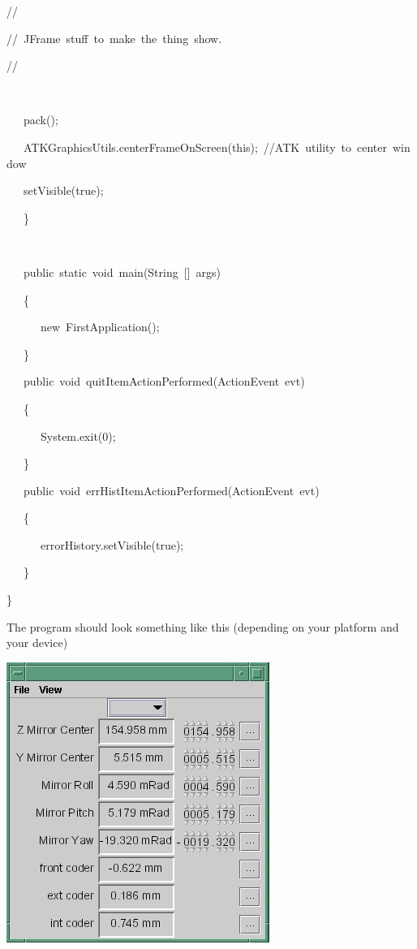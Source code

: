 \begin{lyxcode}
//

//~JFrame~stuff~to~make~the~thing~show.

//

~



~~~pack();

~~~ATKGraphicsUtils.centerFrameOnScreen(this);~//ATK~utility~to~center~window



~~~setVisible(true);

~~~\}

~



~~~public~static~void~main(String~{[}{]}~args)

~~~\{

~~~~~~new~FirstApplication();

~~~\}



~~~public~void~quitItemActionPerformed(ActionEvent~evt)

~~~\{

~~~~~~System.exit(0);

~~~\}



~~~public~void~errHistItemActionPerformed(ActionEvent~evt)

~~~\{

~~~~~~errorHistory.setVisible(true);

~~~\}

\}






\end{lyxcode}


The program should look something like this (depending on your platform
and your device)

\begin{center}
\includegraphics[scale=0.75]{atk/img/prog_guide_exple1}
\par\end{center}


